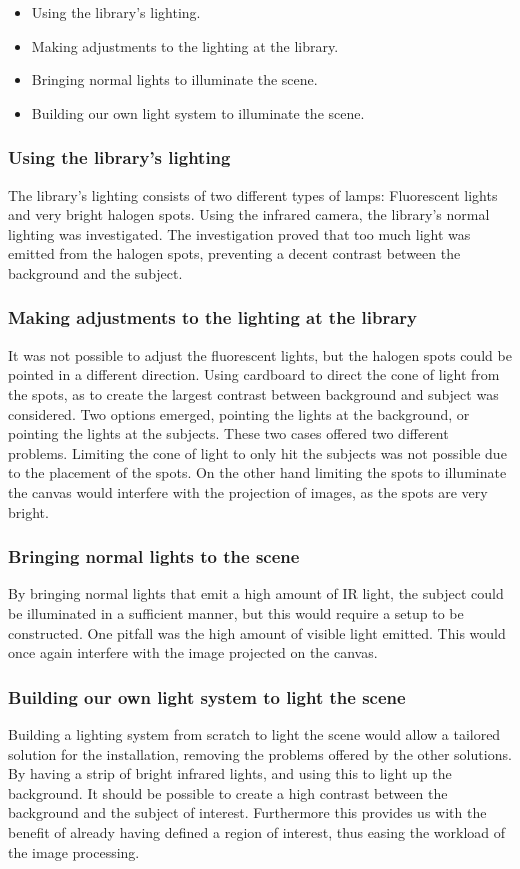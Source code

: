 \begin{itemize}
\item Using the library's lighting.
\item Making adjustments to the lighting at the library.
\item Bringing normal lights to illuminate the scene.
\item Building our own light system to illuminate the scene.
\end{itemize}

\subsubsection{Using the library's lighting}
The library's lighting consists of two different types of lamps: Fluorescent lights and very bright halogen spots. Using the infrared camera, the library's normal lighting was investigated. The investigation proved that too much light was emitted from the halogen spots, preventing a decent contrast between the background and the subject.

\subsubsection{Making adjustments to the lighting at the library}
It was not possible to adjust the fluorescent lights, but the halogen spots could be pointed in a different direction. Using cardboard to direct the cone of light from the spots, as to create the largest contrast between background and subject was considered. Two options emerged, pointing the lights at the background, or pointing the lights at the subjects. These two cases offered two different problems. Limiting the cone of light to only hit the subjects was not possible due to the placement of the spots. On the other hand limiting the spots to illuminate the canvas would interfere with the projection of images, as the spots are very bright.

\subsubsection{Bringing normal lights to the scene} 
By bringing normal lights that emit a high amount of IR light, the subject could be illuminated in a sufficient manner, but this would require a setup to be constructed. One pitfall was the high amount of visible light emitted. This would once again interfere with the image projected on the canvas.

\subsubsection{Building our own light system to light the scene}
Building a lighting system from scratch to light the scene would allow a tailored solution for the installation, removing the problems offered by the other solutions. By having a strip of bright infrared lights, and using this to light up the background. It should be possible to create a high contrast between the background and the subject of interest. Furthermore this provides us with the benefit of already having defined a region of interest, thus easing the workload of the image processing.

